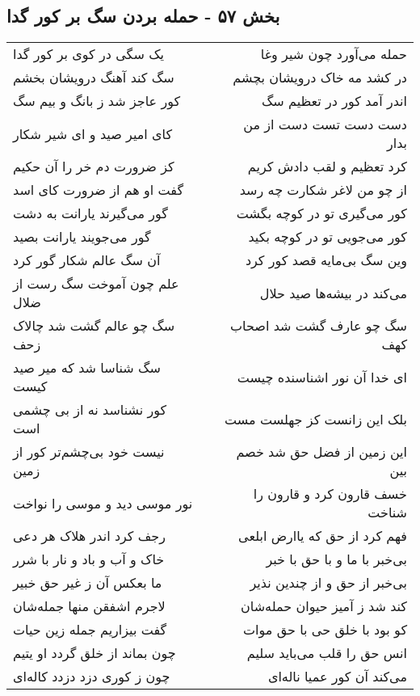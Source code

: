 \begin{center}
\section*{بخش ۵۷ - حمله بردن سگ بر کور گدا}
\label{sec:sh057}
\begin{longtable}{l p{0.5cm} r}
یک سگی در کوی بر کور گدا
&&
حمله می‌آورد چون شیر وغا
\\
سگ کند آهنگ درویشان بخشم
&&
در کشد مه خاک درویشان بچشم
\\
کور عاجز شد ز بانگ و بیم سگ
&&
اندر آمد کور در تعظیم سگ
\\
کای امیر صید و ای شیر شکار
&&
دست دست تست دست از من بدار
\\
کز ضرورت دم خر را آن حکیم
&&
کرد تعظیم و لقب دادش کریم
\\
گفت او هم از ضرورت کای اسد
&&
از چو من لاغر شکارت چه رسد
\\
گور می‌گیرند یارانت به دشت
&&
کور می‌گیری تو در کوچه بگشت
\\
گور می‌جویند یارانت بصید
&&
کور می‌جویی تو در کوچه بکید
\\
آن سگ عالم شکار گور کرد
&&
وین سگ بی‌مایه قصد کور کرد
\\
علم چون آموخت سگ رست از ضلال
&&
می‌کند در بیشه‌ها صید حلال
\\
سگ چو عالم گشت شد چالاک زحف
&&
سگ چو عارف گشت شد اصحاب کهف
\\
سگ شناسا شد که میر صید کیست
&&
ای خدا آن نور اشناسنده چیست
\\
کور نشناسد نه از بی چشمی است
&&
بلک این زانست کز جهلست مست
\\
نیست خود بی‌چشم‌تر کور از زمین
&&
این زمین از فضل حق شد خصم بین
\\
نور موسی دید و موسی را نواخت
&&
خسف قارون کرد و قارون را شناخت
\\
رجف کرد اندر هلاک هر دعی
&&
فهم کرد از حق که یاارض ابلعی
\\
خاک و آب و باد و نار با شرر
&&
بی‌خبر با ما و با حق با خبر
\\
ما بعکس آن ز غیر حق خبیر
&&
بی‌خبر از حق و از چندین نذیر
\\
لاجرم اشفقن منها جمله‌شان
&&
کند شد ز آمیز حیوان حمله‌شان
\\
گفت بیزاریم جمله زین حیات
&&
کو بود با خلق حی با حق موات
\\
چون بماند از خلق گردد او یتیم
&&
انس حق را قلب می‌باید سلیم
\\
چون ز کوری دزد دزدد کاله‌ای
&&
می‌کند آن کور عمیا ناله‌ای
\\

\end{longtable}
\end{center}
